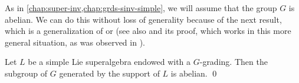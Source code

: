 As in \cref{chap:super-inv,chap:grds-sinv-simple}, we will assume that the group $G$ is abelian. 
We can do this without loss of generality because of the next result, which is a generalization of \cite[Lemma 2.1]{BZ06} or \cite[Proposition 1]{MR2257580} (see also \cite[Proposition 1.12]{livromicha} and its proof, which works in this more general situation, as was observed in \cite{paper-MAP}). 

\begin{prop}\label{prop:simple-Lie-G-abelian}
    Let $L$ be a simple Lie superalgebra endowed with a $G$-grading. 
    Then the subgroup of $G$ generated by the support of $L$ is abelian. \qed
\end{prop}






